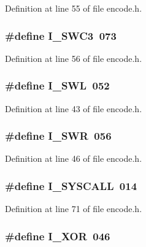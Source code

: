 Definition at line 55 of file encode.\+h.

\subsubsection[{I\+\_\+\+S\+W\+C3}]{\setlength{\rightskip}{0pt plus 5cm}\#define I\+\_\+\+S\+W\+C3~073}\label{encode_8h_a23e883863b3d277d422c92aec2f0f746}


Definition at line 56 of file encode.\+h.

\subsubsection[{I\+\_\+\+S\+WL}]{\setlength{\rightskip}{0pt plus 5cm}\#define I\+\_\+\+S\+WL~052}\label{encode_8h_ac5b7a24fbeba15d8b371837f9be77e58}


Definition at line 43 of file encode.\+h.

\subsubsection[{I\+\_\+\+S\+WR}]{\setlength{\rightskip}{0pt plus 5cm}\#define I\+\_\+\+S\+WR~056}\label{encode_8h_a855d85cca3cf198c64a2abaf3193b0fc}


Definition at line 46 of file encode.\+h.

\subsubsection[{I\+\_\+\+S\+Y\+S\+C\+A\+LL}]{\setlength{\rightskip}{0pt plus 5cm}\#define I\+\_\+\+S\+Y\+S\+C\+A\+LL~014}\label{encode_8h_a7302ddf098a6f76a0abf0d6ea953b870}


Definition at line 71 of file encode.\+h.

\subsubsection[{I\+\_\+\+X\+OR}]{\setlength{\rightskip}{0pt plus 5cm}\#define I\+\_\+\+X\+OR~046}\label{encode_8h_a7b83fb13a9a89754d6c00a3a04de9d4c}


